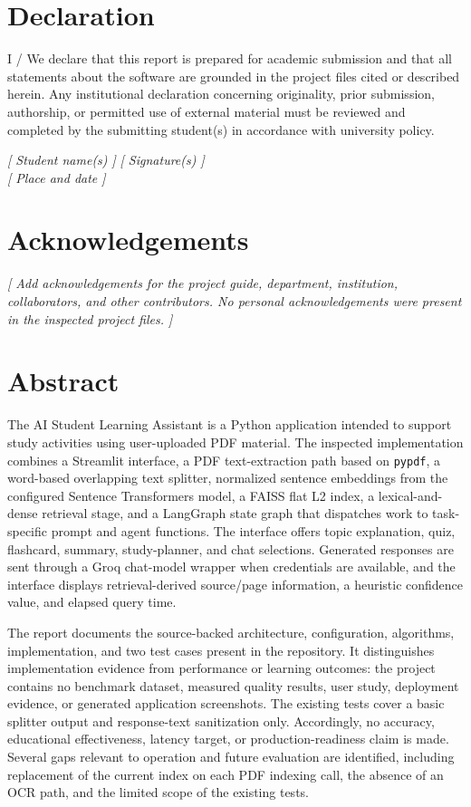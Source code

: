 \documentclass[12pt,a4paper,oneside]{report}
\numberwithin{equation}{chapter}
\newcommand{\placeholder}[1]{\textit{[ #1 ]}}
\begin{document}
\chapter*{Declaration}
I / We declare that this report is prepared for academic submission and that all statements about the software are grounded in the project files cited or described herein. Any institutional declaration concerning originality, prior submission, authorship, or permitted use of external material must be reviewed and completed by the submitting student(s) in accordance with university policy.

\vspace{0.8in}
\noindent
\placeholder{Student name(s)} \hfill \placeholder{Signature(s)}\\[0.5em]
\placeholder{Place and date}

\chapter*{Acknowledgements}
\placeholder{Add acknowledgements for the project guide, department, institution, collaborators, and other contributors. No personal acknowledgements were present in the inspected project files.}

\chapter*{Abstract}
The AI Student Learning Assistant is a Python application intended to support study activities using user-uploaded PDF material. The inspected implementation combines a Streamlit interface, a PDF text-extraction path based on \texttt{pypdf}, a word-based overlapping text splitter, normalized sentence embeddings from the configured Sentence Transformers model, a FAISS flat L2 index, a lexical-and-dense retrieval stage, and a LangGraph state graph that dispatches work to task-specific prompt and agent functions. The interface offers topic explanation, quiz, flashcard, summary, study-planner, and chat selections. Generated responses are sent through a Groq chat-model wrapper when credentials are available, and the interface displays retrieval-derived source/page information, a heuristic confidence value, and elapsed query time.

The report documents the source-backed architecture, configuration, algorithms, implementation, and two test cases present in the repository. It distinguishes implementation evidence from performance or learning outcomes: the project contains no benchmark dataset, measured quality results, user study, deployment evidence, or generated application screenshots. The existing tests cover a basic splitter output and response-text sanitization only. Accordingly, no accuracy, educational effectiveness, latency target, or production-readiness claim is made. Several gaps relevant to operation and future evaluation are identified, including replacement of the current index on each PDF indexing call, the absence of an OCR path, and the limited scope of the existing tests.
\end{document}
